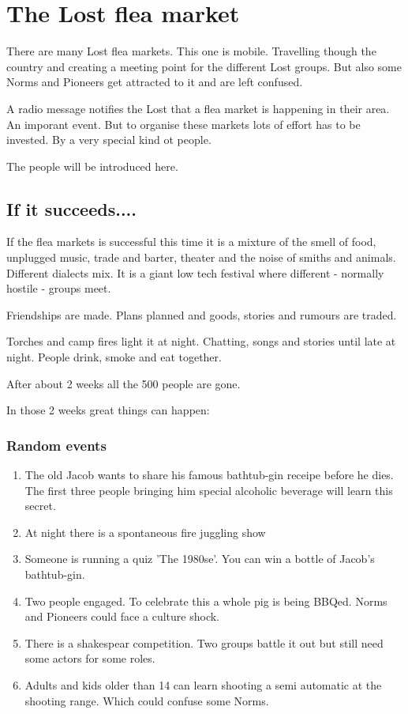 
\chapter{The Lost flea market}

There are many Lost flea markets. This one is mobile. Travelling though the country and creating a meeting point for the different Lost groups. But also some Norms and Pioneers get attracted to it and are left confused.

A radio message notifies the Lost that a flea market is happening in their area. An imporant event. But to organise these markets lots of effort has to be invested. By a very special kind ot people.

The people will be introduced here.

\section{If it succeeds....}

If the flea markets is successful this time it is a mixture of the smell of food, unplugged music, trade and barter, theater and the noise of smiths and animals. Different dialects mix. It is a giant low tech festival where different - normally hostile - groups meet.

Friendships are made. Plans planned and goods, stories and rumours are traded.

Torches and camp fires light it at night. Chatting, songs and stories until late at night. People drink, smoke and eat together.

After about 2 weeks all the 500 people are gone.

In those 2 weeks great things can happen:

\subsection{Random events}

\begin{enumerate}
    \item The old Jacob wants to share his famous bathtub-gin receipe before he dies. The first three people bringing him special alcoholic beverage will learn this secret.
    \item At night there is a spontaneous fire juggling show
    \item Someone is running a quiz 'The 1980se'. You can win a bottle of Jacob's bathtub-gin.
    \item Two people engaged. To celebrate this a whole pig is being BBQed. Norms and Pioneers could face a culture shock.
    \item There is a shakespear competition. Two groups battle it out but still need some actors for some roles.
    \item Adults and kids older than 14 can learn shooting a semi automatic at the shooting range. Which could confuse some Norms.
\end{enumerate}


